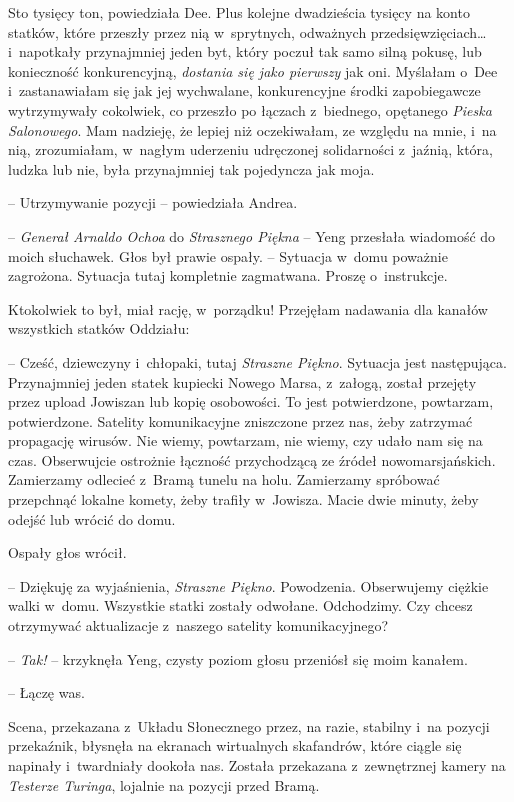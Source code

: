 \documentclass[oneside,polish,11pt,sfheadings]{mwbk}
\begin{document}
Sto tysięcy ton, powiedziała Dee. Plus kolejne dwadzieścia tysięcy na
konto statków, które przeszły przez nią w~sprytnych, odważnych
przedsięwzięciach\ldots  i~napotkały przynajmniej jeden byt, który poczuł
tak samo silną pokusę, lub konieczność konkurencyjną, \textit{dostania się
jako pierwszy} jak oni. Myślałam o~Dee i~zastanawiałam się jak jej
wychwalane, konkurencyjne środki zapobiegawcze wytrzymywały cokolwiek,
co przeszło po łączach z~biednego, opętanego \textit{Pieska Salonowego}.
Mam nadzieję, że lepiej niż oczekiwałam, ze względu na mnie, i~na nią,
zrozumiałam, w~nagłym uderzeniu udręczonej solidarności z~jaźnią, która,
ludzka lub nie, była przynajmniej tak pojedyncza jak moja.

-- Utrzymywanie pozycji -- powiedziała Andrea.

-- \textit{Generał Arnaldo Ochoa} do \textit{Strasznego Piękna} -- Yeng
przesłała wiadomość do moich słuchawek. Głos był prawie ospały. -- Sytuacja w~domu poważnie zagrożona. Sytuacja tutaj kompletnie
zagmatwana. Proszę o~instrukcje.

Ktokolwiek to był, miał rację, w~porządku! Przejęłam nadawania dla
kanałów wszystkich statków Oddziału:

-- Cześć, dziewczyny i~chłopaki, tutaj \textit{Straszne Piękno}. Sytuacja
jest następująca. Przynajmniej jeden statek kupiecki Nowego Marsa, z~załogą, został przejęty przez upload Jowiszan lub kopię osobowości. To
jest potwierdzone, powtarzam, potwierdzone. Satelity komunikacyjne
zniszczone przez nas, żeby zatrzymać propagację wirusów. Nie wiemy,
powtarzam, nie wiemy, czy udało nam się na czas. Obserwujcie ostrożnie
łączność przychodzącą ze źródeł nowomarsjańskich. Zamierzamy odlecieć z~Bramą tunelu na holu. Zamierzamy spróbować przepchnąć lokalne komety,
żeby trafiły w~Jowisza. Macie dwie minuty, żeby odejść lub wrócić do
domu.

Ospały głos wrócił. 

-- Dziękuję za wyjaśnienia, \textit{Straszne Piękno}.
Powodzenia. Obserwujemy ciężkie walki w~domu. Wszystkie statki zostały
odwołane. Odchodzimy. Czy chcesz otrzymywać aktualizacje z~naszego
satelity komunikacyjnego?

-- \textit{Tak!} -- krzyknęła Yeng, czysty poziom głosu przeniósł się
moim kanałem.

-- Łączę was.

Scena, przekazana z~Układu Słonecznego przez, na razie, stabilny i~na
pozycji przekaźnik, błysnęła na ekranach wirtualnych skafandrów, które
ciągle się napinały i~twardniały dookoła nas. Została przekazana z~zewnętrznej kamery na \textit{Testerze Turinga}, lojalnie na pozycji przed
Bramą.
\end{document}
